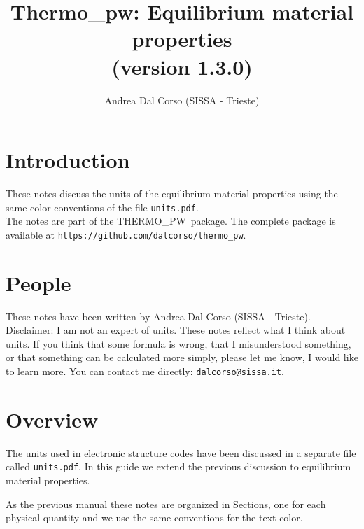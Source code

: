 \documentclass[12pt,a4paper]{article}
\def\version{1.3.0}
\def\tpw{{\sc THERMO\_PW}}
\begin{document}
 
\author{Andrea Dal Corso (SISSA - Trieste)}
\date{}


\title{
  \vskip 1cm
  {\color{red} \Huge Thermo\_pw: Equilibrium material properties} \\
  \Large (version \version)
}

\maketitle

\newpage

\tableofcontents

\newpage

\section{\color{coral}Introduction}
These notes discuss the units of the equilibrium material properties
using the same color conventions of the file \texttt{units.pdf}.\\
The notes are part of the \tpw\ package. The complete package is
available at \texttt{https://github.com/dalcorso/thermo\_pw}.


\newpage
\section{\color{coral}People}
These notes have been written by Andrea Dal Corso (SISSA - Trieste). \\
Disclaimer: I am not an expert of units. 
These notes reflect what I think about units.
If you think that some formula is wrong, that I misunderstood something, or 
that something can be calculated more simply, please let me know, I would 
like to learn more. 
You can contact me directly: \texttt{dalcorso@sissa.it}. 

\newpage
\section{\color{coral}Overview}
The units used in electronic structure codes have been
discussed in a separate file called \texttt{units.pdf}. In this guide
we extend the previous discussion to equilibrium material properties.

As the previous manual these notes are organized in Sections, one for 
each physical quantity and we use the same conventions for the text color.
\end{document}
